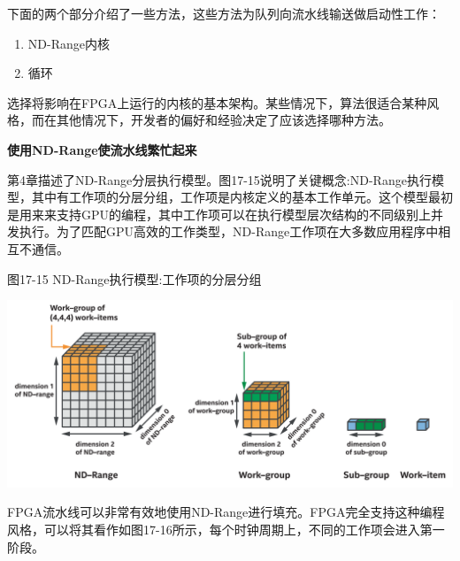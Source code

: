 下面的两个部分介绍了一些方法，这些方法为队列向流水线输送做启动性工作：\par

\begin{enumerate}
	\item ND-Range内核
	\item 循环
\end{enumerate}

选择将影响在FPGA上运行的内核的基本架构。某些情况下，算法很适合某种风格，而在其他情况下，开发者的偏好和经验决定了应该选择哪种方法。\par

\hspace*{\fill} \par %
\textbf{使用ND-Range使流水线繁忙起来}

第4章描述了ND-Range分层执行模型。图17-15说明了关键概念:ND-Range执行模型，其中有工作项的分层分组，工作项是内核定义的基本工作单元。这个模型最初是用来来支持GPU的编程，其中工作项可以在执行模型层次结构的不同级别上并发执行。为了匹配GPU高效的工作类型，ND-Range工作项在大多数应用程序中相互不通信。\par

\hspace*{\fill} \par %
图17-15 ND-Range执行模型:工作项的分层分组
\begin{center}
	\includegraphics[width=1.0\textwidth]{content/chapter-17/images/14}
\end{center}

FPGA流水线可以非常有效地使用ND-Range进行填充。FPGA完全支持这种编程风格，可以将其看作如图17-16所示，每个时钟周期上，不同的工作项会进入第一阶段。\par

